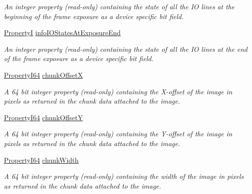 \begin{DoxyCompactItemize}
\begin{DoxyCompactList}\small\item\em An integer property {\bfseries }(read-\/only) containing the state of all the I\+O lines at the beginning of the frame exposure as a device specific bit field. \end{DoxyCompactList}\item 
\hyperlink{group___common_interface_ga12d5e434238ca242a1ba4c6c3ea45780}{Property\+I} \hyperlink{classmv_i_m_p_a_c_t_1_1acquire_1_1_request_a39f42fe7bd18748985f3d0bca0c2ad01}{info\+I\+O\+States\+At\+Exposure\+End}
\begin{DoxyCompactList}\small\item\em An integer property {\bfseries }(read-\/only) containing the state of all the I\+O lines at the end of the frame exposure as a device specific bit field. \end{DoxyCompactList}\item 
\hyperlink{group___common_interface_ga81749b2696755513663492664a18a893}{Property\+I64} \hyperlink{classmv_i_m_p_a_c_t_1_1acquire_1_1_request_af0a8aaee59305ce3215db9bea6826958}{chunk\+Offset\+X}
\begin{DoxyCompactList}\small\item\em A 64 bit integer property {\bfseries }(read-\/only) containing the X-\/offset of the image in pixels as returned in the chunk data attached to the image. \end{DoxyCompactList}\item 
\hyperlink{group___common_interface_ga81749b2696755513663492664a18a893}{Property\+I64} \hyperlink{classmv_i_m_p_a_c_t_1_1acquire_1_1_request_aadd30b0a6de334e3819621b37e0e2c63}{chunk\+Offset\+Y}
\begin{DoxyCompactList}\small\item\em A 64 bit integer property {\bfseries }(read-\/only) containing the Y-\/offset of the image in pixels as returned in the chunk data attached to the image. \end{DoxyCompactList}\item 
\hyperlink{group___common_interface_ga81749b2696755513663492664a18a893}{Property\+I64} \hyperlink{classmv_i_m_p_a_c_t_1_1acquire_1_1_request_acda54bfbef3fcf4719dc68d16c2b5193}{chunk\+Width}
\begin{DoxyCompactList}\small\item\em A 64 bit integer property {\bfseries }(read-\/only) containing the width of the image in pixels as returned in the chunk data attached to the image. \end{DoxyCompactList}\item 

\end{DoxyCompactItemize}
